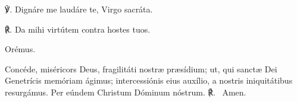

℣. Dignáre me laudáre te, Virgo sacráta.

℟. Da mihi virtútem contra hostes tuos.

Orémus. 

Concéde, miséricors Deus, fragilitáti nostræ præsídium; ut, qui sanctæ Dei Genetrícis memóriam ágimus; intercessiónis eius auxílio, a nostris iniquitátibus resurgámus. Per eúndem Christum Dóminum nóstrum.  ℟. ~Amen.